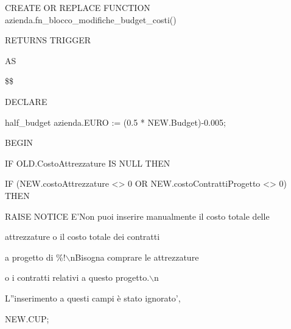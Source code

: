         \begin{flushleft}
            \begin{description}
                \item CREATE OR REPLACE FUNCTION azienda.fn\_blocco\_modifiche\_budget\_costi()
                \item RETURNS TRIGGER
                \item AS
                \item \$\$
                \item DECLARE
                \begin{description}
                    \item half\_budget azienda.EURO := (0.5 * NEW.Budget)-0.005;
                \end{description}
                \item BEGIN
                \begin{description}
                    \item IF OLD.CostoAttrezzature IS NULL THEN
                    \vspace{0.2cm}
                    \begin{description}
                        \item IF (NEW.costoAttrezzature <> 0 OR NEW.costoContrattiProgetto <> 0) THEN
                        \vspace{0.2cm}
                        \begin{description}
                            \item RAISE NOTICE E'Non puoi inserire manualmente il costo totale delle
                            \item \hspace{2.6cm}attrezzature o il costo totale dei contratti
                            \item \hspace{2.6cm}a progetto di \%!$\backslash$nBisogna comprare le attrezzature
                            \item \hspace{2.6cm}o i contratti relativi a questo progetto.$\backslash$n
                            \item \hspace{2.6cm}L''inserimento a questi campi è stato ignorato',
                            \item \hspace{2.6cm}NEW.CUP;
                        \end{description}

\end{description}
\end{description}
\end{description}
\end{flushleft}

